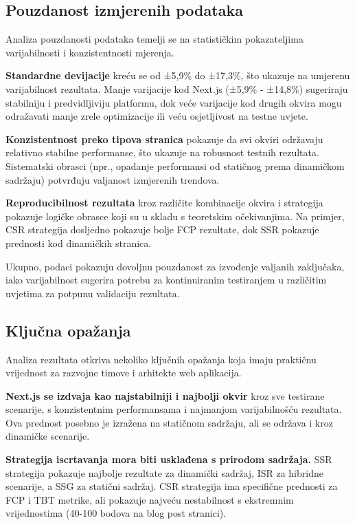 \subsection{Pouzdanost izmjerenih podataka}

Analiza pouzdanosti podataka temelji se na statističkim pokazateljima varijabilnosti i konzistentnosti mjerenja.

\textbf{Standardne devijacije} kreću se od ±5,9\% do ±17,3\%, što ukazuje na umjerenu varijabilnost rezultata. Manje varijacije kod Next.js (±5,9\% - ±14,8\%) sugeriraju stabilniju i predvidljiviju platformu, dok veće varijacije kod drugih okvira mogu odražavati manje zrele optimizacije ili veću osjetljivost na testne uvjete.

\textbf{Konzistentnost preko tipova stranica} pokazuje da svi okviri održavaju relativno stabilne performanse, što ukazuje na robusnost testnih rezultata. Sistematski obrasci (npr., opadanje performansi od statičnog prema dinamičkom sadržaju) potvrđuju valjanost izmjerenih trendova.

\textbf{Reproducibilnost rezultata} kroz različite kombinacije okvira i strategija pokazuje logičke obrasce koji su u skladu s teoretskim očekivanjima. Na primjer, CSR strategija dosljedno pokazuje bolje FCP rezultate, dok SSR pokazuje prednosti kod dinamičkih stranica.

Ukupno, podaci pokazuju dovoljnu pouzdanost za izvođenje valjanih zaključaka, iako varijabilnost sugerira potrebu za kontinuiranim testiranjem u različitim uvjetima za potpunu validaciju rezultata.

\subsection{Ključna opažanja}

Analiza rezultata otkriva nekoliko ključnih opažanja koja imaju praktičnu vrijednost za razvojne timove i arhitekte web aplikacija.

\textbf{Next.js se izdvaja kao najstabilniji i najbolji okvir} kroz sve testirane scenarije, s konzistentnim performansama i najmanjom varijabilnošću rezultata. Ova prednost posebno je izražena na statičnom sadržaju, ali se održava i kroz dinamičke scenarije.

\textbf{Strategija iscrtavanja mora biti usklađena s prirodom sadržaja.} SSR strategija pokazuje najbolje rezultate za dinamički sadržaj, ISR za hibridne scenarije, a SSG za statični sadržaj. CSR strategija ima specifične prednosti za FCP i TBT metrike, ali pokazuje najveću nestabilnost s ekstremnim vrijednostima (40-100 bodova na blog post stranici).

